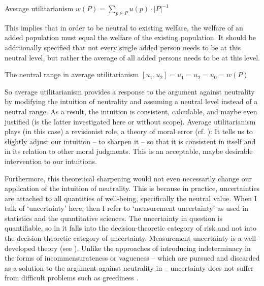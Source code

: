 \begin{Definition}{Average utilitarianism}{}
$w(P) = \sum_{p \in P} u(p) \cdot |P|^{-1}$
\end{Definition}

This implies that in order to be neutral to existing welfare, the welfare of an added population must equal the welfare of the existing population.  It should be additionally specified that not every single added person needs to be at this neutral level, but rather the average of all added persons needs to be at this level.

\begin{Definition}{The neutral range in average utilitarianism}{}
$[u_1, u_2] = u_1 = u_2 = u_0 = w(P)$
\end{Definition}

So average utilitarianism provides a response to the argument against neutrality by modifying the intuition of neutrality and assuming a neutral level instead of a neutral range. As a result, the intuition is consistent, calculable, and maybe even justified (is the latter investigated here or without scope). Average utilitarianism plays (in this case) a revisionist role, a theory of moral error (cf. ): It tells us to slightly adjust our intuition – to sharpen it – so that it is consistent in itself and in its relation to other moral judgments. This is an acceptable, maybe desirable intervention to our intuitions.  

Furthermore, this theoretical sharpening would not even necessarily change our application of the intuition of neutrality. This is because in practice, uncertainties are attached to all quantities of well-being, specifically the neutral value. When I talk of ‘uncertainty’ here, then I refer to ‘measurement uncertainty’ as used in statistics and the quantitative sciences. The uncertainty in question is quantifiable, so in it falls into the decision-theoretic category of risk and not into the decision-theoretic category of uncertainty. Measurement uncertainty is a well-developed theory (see ). Unlike the approaches of introducing indeterminacy in the forms of incommensurateness or vagueness – which are pursued and discarded as a solution to the argument against neutrality in  – uncertainty does not suffer from difficult problems such as greediness .  

